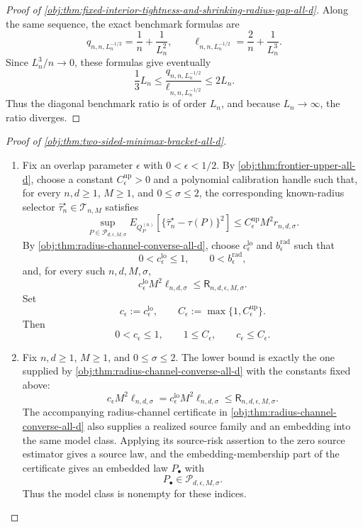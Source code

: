 \documentclass[11pt]{article}
\begin{document}
\begin{proof}[Proof of \cref{obj:thm:fixed-interior-tightness-and-shrinking-radius-gap-all-d}]
Along the same sequence, the exact benchmark formulas are
\[
q_{n,n,L_n^{-1/2}}=\frac1n+\frac1{L_n^2},\qquad
\ell_{n,n,L_n^{-1/2}}=\frac2n+\frac1{L_n^3}.
\]
Since \(L_n^3/n\to0\), these formulas give eventually
\[
\frac13 L_n
\le
\frac{q_{n,n,L_n^{-1/2}}}{\ell_{n,n,L_n^{-1/2}}}
\le
2L_n.
\]
Thus the diagonal benchmark ratio is of order \(L_n\), and because \(L_n\to\infty\), the ratio diverges.
\end{proof}

\begin{proof}[Proof of \cref{obj:thm:two-sided-minimax-bracket-all-d}]
\begin{enumerate}
\item Fix an overlap parameter \(\epsilon\) with \(0<\epsilon<1/2\).  By
\cref{obj:thm:frontier-upper-all-d}, choose a constant
\(C_{\epsilon}^{\mathrm{up}}>0\) and a polynomial calibration handle such that, for every
\(n,d\ge1\), \(M\ge1\), and \(0\le\sigma\le2\), the corresponding known-radius selector
\(\widehat\tau_n^{\star}\in\mathcal T_{n,M}\) satisfies
\[
\sup_{P\in\mathcal P_{d,\epsilon,M,\sigma}}
E_{Q_P^{(n)}}\!\left[
\{\widehat\tau_n^{\star}-\tau(P)\}^2
\right]
\le
C_{\epsilon}^{\mathrm{up}}M^2 r_{n,d,\sigma}.
\]
By \cref{obj:thm:radius-channel-converse-all-d}, choose
\(c_{\epsilon}^{\mathrm{lo}}\) and \(b_{\epsilon}^{\mathrm{rad}}\) such that
\[
0<c_{\epsilon}^{\mathrm{lo}}\le1,\qquad 0<b_{\epsilon}^{\mathrm{rad}},
\]
and, for every such \(n,d,M,\sigma\),
\[
c_{\epsilon}^{\mathrm{lo}}M^2\ell_{n,d,\sigma}
\le
\mathsf R_{n,d,\epsilon,M,\sigma}.
\]
Set
\[
c_{\epsilon}:=c_{\epsilon}^{\mathrm{lo}},
\qquad
C_{\epsilon}:=\max\{1,C_{\epsilon}^{\mathrm{up}}\}.
\]
Then
\[
0<c_{\epsilon}\le1,\qquad 1\le C_{\epsilon},\qquad c_{\epsilon}\le C_{\epsilon}.
\] %

\item Fix \(n,d\ge1\), \(M\ge1\), and \(0\le\sigma\le2\).  The lower bound is exactly the
one supplied by \cref{obj:thm:radius-channel-converse-all-d} with the constants fixed above:
\[
c_{\epsilon}M^2\ell_{n,d,\sigma}
=
c_{\epsilon}^{\mathrm{lo}}M^2\ell_{n,d,\sigma}
\le
\mathsf R_{n,d,\epsilon,M,\sigma}.
\]
The accompanying radius-channel certificate in
\cref{obj:thm:radius-channel-converse-all-d} also supplies a realized source family and an
embedding into the same model class.  Applying its source-risk assertion to the zero source
estimator gives a source law, and the embedding-membership part of the certificate gives an
embedded law \(P_{\bullet}\) with
\[
P_{\bullet}\in\mathcal P_{d,\epsilon,M,\sigma}.
\]
Thus the model class is nonempty for these indices. %


\end{enumerate}
\end{proof}
\end{document}
